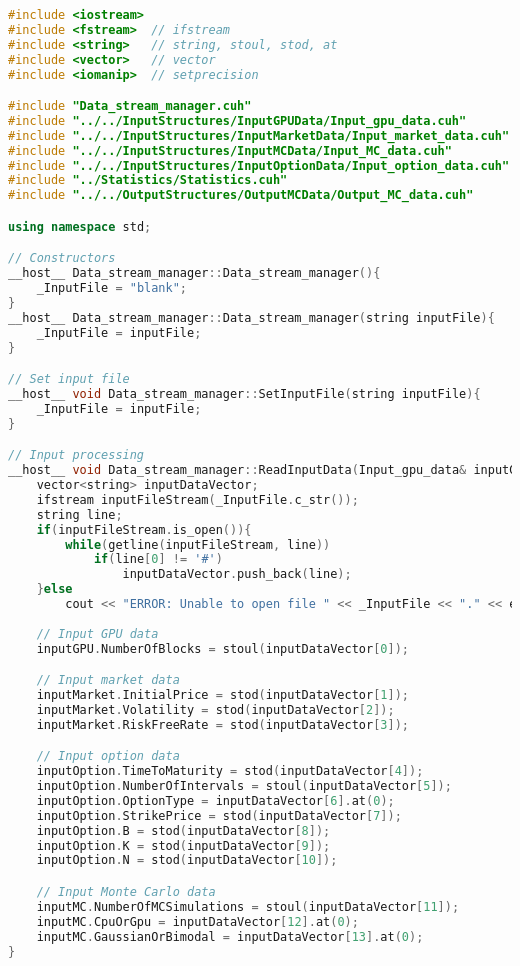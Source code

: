 \begin{lstlisting}[language=C++, caption={\texttt{libraries/CoreLibraries/DataStreamManager/Data\_stream\_manager.cu}}]
#include <iostream>
#include <fstream>	// ifstream
#include <string>	// string, stoul, stod, at
#include <vector>	// vector
#include <iomanip>	// setprecision

#include "Data_stream_manager.cuh"
#include "../../InputStructures/InputGPUData/Input_gpu_data.cuh"
#include "../../InputStructures/InputMarketData/Input_market_data.cuh"
#include "../../InputStructures/InputMCData/Input_MC_data.cuh"
#include "../../InputStructures/InputOptionData/Input_option_data.cuh"
#include "../Statistics/Statistics.cuh"
#include "../../OutputStructures/OutputMCData/Output_MC_data.cuh"

using namespace std;

// Constructors
__host__ Data_stream_manager::Data_stream_manager(){
	_InputFile = "blank";
}
__host__ Data_stream_manager::Data_stream_manager(string inputFile){
	_InputFile = inputFile;
}

// Set input file
__host__ void Data_stream_manager::SetInputFile(string inputFile){
	_InputFile = inputFile;	
}

// Input processing
__host__ void Data_stream_manager::ReadInputData(Input_gpu_data& inputGPU, Input_option_data& inputOption, Input_market_data& inputMarket, Input_MC_data& inputMC) const{
	vector<string> inputDataVector;
	ifstream inputFileStream(_InputFile.c_str());
	string line;
	if(inputFileStream.is_open()){
		while(getline(inputFileStream, line))
			if(line[0] != '#')
				inputDataVector.push_back(line);
	}else
		cout << "ERROR: Unable to open file " << _InputFile << "." << endl;
		
	// Input GPU data
	inputGPU.NumberOfBlocks = stoul(inputDataVector[0]);

	// Input market data
	inputMarket.InitialPrice = stod(inputDataVector[1]);
	inputMarket.Volatility = stod(inputDataVector[2]);
	inputMarket.RiskFreeRate = stod(inputDataVector[3]);

	// Input option data
	inputOption.TimeToMaturity = stod(inputDataVector[4]);
	inputOption.NumberOfIntervals = stoul(inputDataVector[5]);
	inputOption.OptionType = inputDataVector[6].at(0);
	inputOption.StrikePrice = stod(inputDataVector[7]);
	inputOption.B = stod(inputDataVector[8]);
	inputOption.K = stod(inputDataVector[9]);
	inputOption.N = stod(inputDataVector[10]);

	// Input Monte Carlo data
	inputMC.NumberOfMCSimulations = stoul(inputDataVector[11]);
	inputMC.CpuOrGpu = inputDataVector[12].at(0);
	inputMC.GaussianOrBimodal = inputDataVector[13].at(0);
}


\end{lstlisting}
